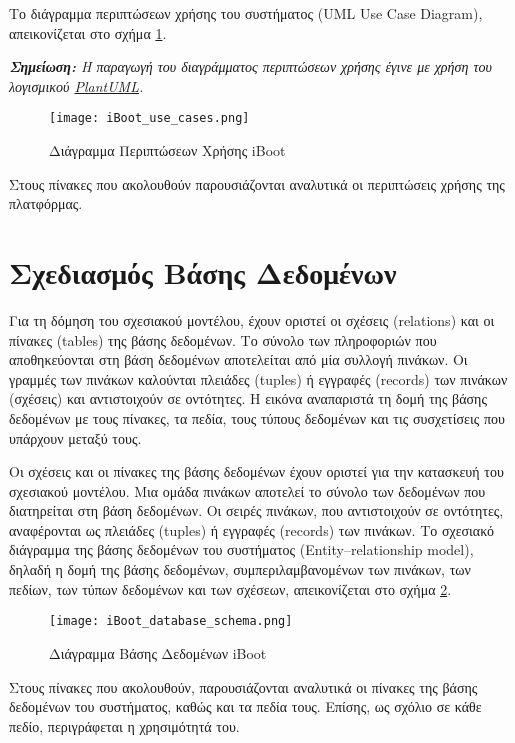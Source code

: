 Το διάγραμμα περιπτώσεων χρήσης του συστήματος (UML Use Case Diagram), απεικονίζεται στο σχήμα \ref{fig:iboot-use-cases}.

\textit{\textbf{Σημείωση:} Η παραγωγή του διαγράμματος περιπτώσεων χρήσης έγινε με χρήση του λογισμικού \href{http://www.plantuml.com/plantuml/uml}{PlantUML}.}

\begin{figure}[ht]
	\centering
	\texttt{[image: iBoot\_use\_cases.png]}
	\caption{Διάγραμμα Περιπτώσεων Χρήσης iBoot}
	\label{fig:iboot-use-cases}
\end{figure}

\FloatBarrier

Στους πίνακες που ακολουθούν παρουσιάζονται αναλυτικά οι περιπτώσεις χρήσης της πλατφόρμας.

\FloatBarrier

\FloatBarrier

\section{Σχεδιασμός Βάσης Δεδομένων}
Για τη δόμηση του σχεσιακού μοντέλου, έχουν οριστεί οι σχέσεις (relations) και οι πίνακες (tables) της βάσης δεδομένων. Το σύνολο των πληροφοριών που αποθηκεύονται στη βάση δεδομένων αποτελείται από μία συλλογή πινάκων. Οι γραμμές των πινάκων καλούνται πλειάδες (tuples) ή εγγραφές (records) των πινάκων (σχέσεις) και αντιστοιχούν σε οντότητες. Η εικόνα αναπαριστά τη δομή της βάσης δεδομένων με τους πίνακες, τα πεδία, τους τύπους δεδομένων και τις συσχετίσεις που υπάρχουν μεταξύ τους.

Οι σχέσεις και οι πίνακες της βάσης δεδομένων έχουν οριστεί για την κατασκευή του σχεσιακού μοντέλου. Μια ομάδα πινάκων αποτελεί το σύνολο των δεδομένων που διατηρείται στη βάση δεδομένων. Οι σειρές πινάκων, που αντιστοιχούν σε οντότητες, αναφέρονται ως πλειάδες (tuples) ή εγγραφές (records) των πινάκων. Το σχεσιακό διάγραμμα της βάσης δεδομένων του συστήματος (Entity–relationship model), δηλαδή η δομή της βάσης δεδομένων, συμπεριλαμβανομένων των πινάκων, των πεδίων, των τύπων δεδομένων και των σχέσεων, απεικονίζεται στο σχήμα \ref{fig:iboot-db}.

\begin{figure}[h]
	\centering
	\texttt{[image: iBoot\_database\_schema.png]}
	\caption{Διάγραμμα Βάσης Δεδομένων iBoot}
	\label{fig:iboot-db}
\end{figure}

Στους πίνακες που ακολουθούν, παρουσιάζονται αναλυτικά οι πίνακες της βάσης δεδομένων του συστήματος, καθώς και τα πεδία τους. Επίσης, ως σχόλιο σε κάθε πεδίο, περιγράφεται η χρησιμότητά του.


